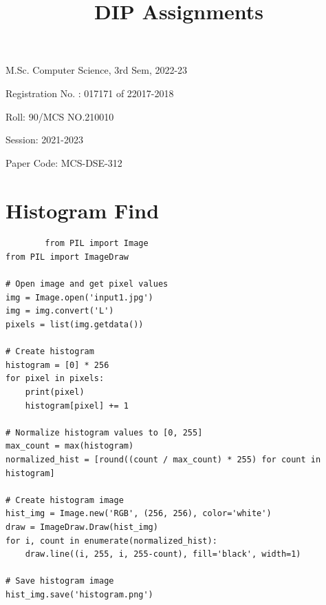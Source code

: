 \documentclass[a4paper,8pt]{article}
\title{DIP Assignments}
\begin{document}
\maketitle
\centering
M.Sc. Computer Science, 3rd Sem, 2022-23


Registration No. : 017171 of 22017-2018


Roll: 90/MCS NO.210010


Session: 2021-2023


Paper Code: MCS-DSE-312
\clearpage
\tableofcontents
\clearpage
        \section{Histogram Find}
        \begin{verbatim}
        from PIL import Image
from PIL import ImageDraw

# Open image and get pixel values
img = Image.open('input1.jpg')
img = img.convert('L')
pixels = list(img.getdata())

# Create histogram
histogram = [0] * 256
for pixel in pixels:
    print(pixel)
    histogram[pixel] += 1

# Normalize histogram values to [0, 255]
max_count = max(histogram)
normalized_hist = [round((count / max_count) * 255) for count in histogram]

# Create histogram image
hist_img = Image.new('RGB', (256, 256), color='white')
draw = ImageDraw.Draw(hist_img)
for i, count in enumerate(normalized_hist):
    draw.line((i, 255, i, 255-count), fill='black', width=1)

# Save histogram image
hist_img.save('histogram.png')


        \end{verbatim}
        
\end{document}
